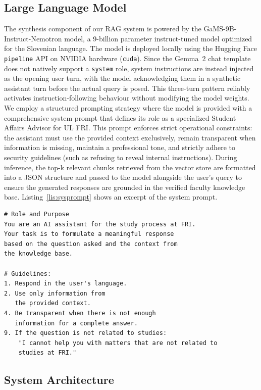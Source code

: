 \documentclass[fleqn,moreauthors,10pt]{ds_report}
\begin{document}
\subsection*{Large Language Model}
The synthesis component of our RAG system is powered by the GaMS-9B-Instruct-Nemotron model, a 9-billion parameter instruct-tuned model optimized for the Slovenian language.
The model is deployed locally using the Hugging Face \texttt{pipeline} API on NVIDIA hardware (\texttt{cuda}).
Since the Gemma~2 chat template does not natively support a \texttt{system} role, system instructions are instead injected as the opening user turn, with the model acknowledging them in a synthetic assistant turn before the actual query is posed.
This three-turn pattern reliably activates instruction-following behaviour without modifying the model weights.
We employ a structured prompting strategy where the model is provided with a comprehensive system prompt that defines its role as a specialized Student Affairs Advisor for UL FRI.
This prompt enforces strict operational constraints: the assistant must use the provided context exclusively, remain transparent when information is missing, maintain a professional tone, and strictly adhere to security guidelines (such as refusing to reveal internal instructions).
During inference, the top-k relevant chunks retrieved from the vector store are formatted into a JSON structure and passed to the model alongside the user's query to ensure the generated responses are grounded in the verified faculty knowledge base.
Listing~\ref{lis:sysprompt} shows an excerpt of the system prompt.

\begin{lstlisting}[frame=single, breaklines=true, caption={Excerpt of the system prompt.}, label={lis:sysprompt}]
# Role and Purpose
You are an AI assistant for the study process at FRI.
Your task is to formulate a meaningful response
based on the question asked and the context from
the knowledge base.

# Guidelines:
1. Respond in the user's language.
2. Use only information from
   the provided context.
4. Be transparent when there is not enough
   information for a complete answer.
9. If the question is not related to studies:
    "I cannot help you with matters that are not related to
    studies at FRI."
\end{lstlisting}


\subsection*{System Architecture}
\end{document}
